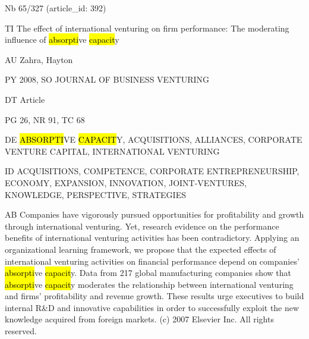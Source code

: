 \documentclass[a4paper]{article}
\begin{document}
\vspace*{-2cm}
Nb \tabto{0cm}65/327 (article\_id: 392)\par
TI \tabto{0cm}The effect of international venturing on firm performance: The moderating influence of \hl{absorpti}ve \hl{capacit}y\par
AU \tabto{0cm}Zahra, Hayton\par
PY \tabto{0cm}2008, SO JOURNAL OF BUSINESS VENTURING\par
DT \tabto{0cm}Article\par
PG \tabto{0cm}26, NR 91, TC 68\par
DE \tabto{0cm}\hl{ABSORPTI}VE \hl{CAPACIT}Y, ACQUISITIONS, ALLIANCES, CORPORATE VENTURE CAPITAL, INTERNATIONAL VENTURING\par
ID \tabto{0cm}ACQUISITIONS, COMPETENCE, CORPORATE ENTREPRENEURSHIP, ECONOMY, EXPANSION, INNOVATION, JOINT-VENTURES, KNOWLEDGE, PERSPECTIVE, STRATEGIES\par
AB \tabto{0cm}Companies have vigorously pursued opportunities for profitability and growth through international venturing. Yet, research evidence on the performance benefits of international venturing activities has been contradictory. Applying an organizational learning framework, we propose that the expected effects of international venturing activities on financial performance depend on companies' \hl{absorpti}ve \hl{capacit}y. Data from 217 global manufacturing companies show that \hl{absorpti}ve \hl{capacit}y moderates the relationship between international venturing and firms' profitability and revenue growth. These results urge executives to build internal R\&D and innovative capabilities in order to successfully exploit the new knowledge acquired from foreign markets. (c) 2007 Elsevier Inc. All rights reserved.\par
\clearpage
\end{document}
